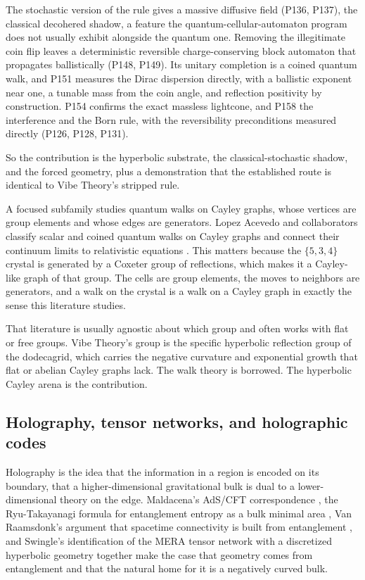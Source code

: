 The
stochastic version of the rule gives a massive diffusive field (P136, P137), the classical decohered shadow, a
feature the quantum-cellular-automaton program does not usually exhibit alongside the quantum one. Removing the
illegitimate coin flip leaves a deterministic reversible charge-conserving block automaton that propagates
ballistically (P148, P149). Its unitary completion is a coined quantum walk, and P151 measures the Dirac
dispersion directly, with a ballistic exponent near one, a tunable mass from the coin angle, and reflection
positivity by construction. P154 confirms the exact massless lightcone, and P158 the interference and the Born
rule, with the reversibility preconditions measured directly (P126, P128, P131).

So the contribution is the
hyperbolic substrate, the classical-stochastic shadow, and the forced geometry, plus a demonstration that the
established route is identical to Vibe Theory's stripped rule.

A focused subfamily studies quantum walks on Cayley graphs, whose vertices are group elements and whose edges
are generators. Lopez Acevedo and collaborators classify scalar and coined quantum walks on Cayley graphs and
connect their continuum limits to relativistic equations \cite{lopezacevedo2006}. This matters because the
$\{5,3,4\}$ crystal is generated by a Coxeter group of reflections, which makes it a Cayley-like graph of that
group. The cells are group elements, the moves to neighbors are generators, and a walk on the crystal is a
walk on a Cayley graph in exactly the sense this literature studies.

That literature is usually agnostic about
which group and often works with flat or free groups. Vibe Theory's group is the specific hyperbolic
reflection group of the dodecagrid, which carries the negative curvature and exponential growth that flat or
abelian Cayley graphs lack. The walk theory is borrowed. The hyperbolic Cayley arena is the contribution.

\subsection{Holography, tensor networks, and holographic codes}

Holography is the idea that the information in a region is encoded on its boundary, that a higher-dimensional
gravitational bulk is dual to a lower-dimensional theory on the edge. Maldacena's AdS/CFT correspondence
\cite{maldacena1998}, the Ryu-Takayanagi formula for entanglement entropy as a bulk minimal area
\cite{ryu2006}, Van Raamsdonk's argument that spacetime connectivity is built from entanglement
\cite{vanraamsdonk2010}, and Swingle's identification of the MERA tensor network with a discretized
hyperbolic geometry \cite{swingle2012} together make the case that geometry comes from entanglement and that
the natural home for it is a negatively curved bulk.

